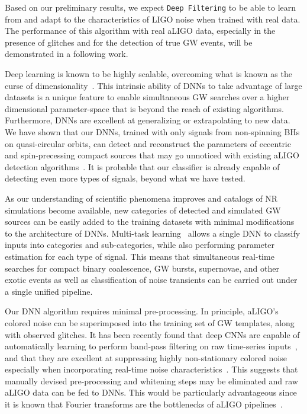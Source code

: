 \documentclass[aps,prd,%
amsmath,floats,floatfix, twocolumn, superscriptaddress,nofootinbib,showpacs]{revtex4-1}
\begin{document}
Based on our preliminary results, we expect \texttt{Deep Filtering} to be able to learn from and adapt to the characteristics of LIGO noise when trained with real data. The performance of this algorithm with real aLIGO data, especially in the presence of glitches and for the detection of true GW events, will be demonstrated in a following work.

Deep learning is known to be highly scalable, overcoming what is known as the curse of dimensionality~\cite{Scaling}. This intrinsic ability of DNNs to take advantage of large datasets is a unique feature to enable simultaneous GW searches over a higher dimensional parameter-space that is beyond the reach of existing algorithms. Furthermore, DNNs are excellent at generalizing or extrapolating to new data. We have shown that our DNNs, trained with only signals from non-spinning BHs on quasi-circular orbits, can detect and reconstruct the parameters of eccentric and spin-precessing compact sources that may go unnoticed with existing aLIGO detection algorithms~\cite{Huerta:2017a,Tiwari:2016,Huerta:2014,Huerta:2013a}. It is probable that our classifier is already capable of detecting even more types of signals, beyond what we have tested.

As our understanding of scientific phenomena improves and catalogs of NR simulations become available, new categories of detected and simulated GW sources can be easily added to the training datasets with minimal modifications to the architecture of DNNs. Multi-task learning~\cite{MultiTaskCNN} allows a single DNN to classify inputs into categories and sub-categories, while also performing parameter estimation for each type of signal. This means that simultaneous real-time searches for compact binary coalescence, GW bursts, supernovae, and other exotic events as well as classification of noise transients can be carried out under a single unified pipeline.

Our DNN algorithm requires minimal pre-processing. In principle, aLIGO's colored noise can be superimposed into the training set of GW templates, along with observed glitches. It has been recently found that deep CNNs are capable of automatically learning to perform band-pass filtering on raw time-series inputs~\cite{DCNN-Raw}, and that they are excellent at suppressing highly non-stationary colored noise~\cite{SpeechEnhancement} especially when incorporating real-time noise characteristics~\cite{NoiseCues}. This suggests that manually devised pre-processing and whitening steps may be eliminated and raw aLIGO data can be fed to DNNs. This would be particularly advantageous since it is known that Fourier transforms are the bottlenecks of aLIGO pipelines~\cite{2016CQGra..33u5004U}.
\end{document}

